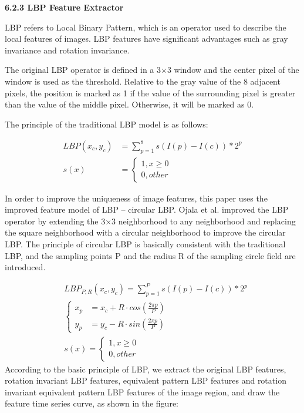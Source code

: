 \documentclass{apmcmthesis}
\begin{document}
\noindent\textbf{6.2.3 LBP Feature Extractor}

LBP refers to Local Binary Pattern, which is an operator used to describe the local features of images. LBP features have significant advantages such as gray invariance and rotation invariance.


The original LBP operator is defined in a 3×3 window and the center pixel of the window is used as the threshold.    Relative to the gray value of the 8 adjacent pixels, the position is marked as 1 if the value of the surrounding pixel is greater than the value of the middle pixel.    Otherwise, it will be marked as 0.

The principle of the traditional LBP model is as follows:


	\begin{equation}
			\tag{6-2-4}
			\begin{split}
				LBP(x_{c},y_{c}) &= \sum_{p = 1}^{8}s(I(p)-I(c))*2^{p} \\
				s(x) &= \begin{cases}	
					 1, x \geq 0 \\ 0, other
				  \end{cases}
			\end{split}
		\end{equation}
	
In order to improve the uniqueness of image features, this paper uses the improved feature model of LBP -- circular LBP. Ojala et al. improved the LBP operator by extending the 3×3 neighborhood to any neighborhood and replacing the square neighborhood with a circular neighborhood to improve the circular LBP. The principle of circular LBP is basically consistent with the traditional LBP, and the sampling points P and the radius R of the sampling circle field are introduced.


	\begin{equation}
	\tag{6-2-5}
		\begin{split}	
		&	LBP_{P,R}(x_{c},y_{c}) = \sum_{p = 1}^{P}s(I(p)-I(c))*2^{p} \\
		 &\begin{cases}
			x_{p} &= x_{c}+R\cdot cos(\frac{2\pi p}{P}) \\
				y_{p} &= y_{c}-R\cdot sin(\frac{2\pi p}{P}) 
			\end{cases}	\\
			&s(x) = \begin{cases}
			1, x \geq 0 \\ 0, other
		\end{cases}
	\end{split}
\end{equation}
According to the basic principle of LBP, we extract the original LBP features, rotation invariant LBP features, equivalent pattern LBP features and rotation invariant equivalent pattern LBP features of the image region, and draw the feature time series curve, as shown in the figure:
\end{document}
